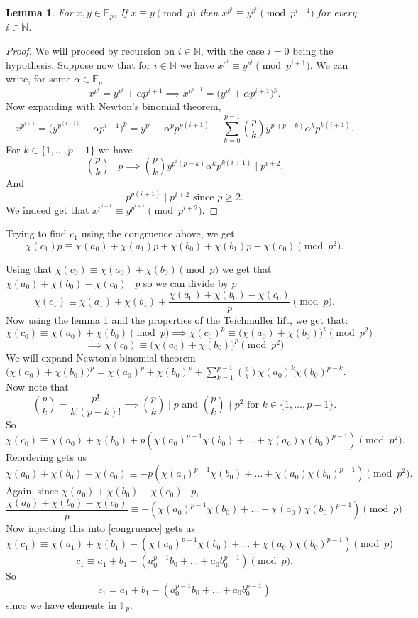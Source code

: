 \documentclass[oneside, a4paper, onecolumn, 11pt]{article}
\newtheorem{lemma}{Lemma}
\theoremstyle{definition}
\begin{document}
\begin{lemma}\label{equiv+i}
For $x,y\in \mathbb{F}_p$, If $x\equiv y \pmod p$ then $x^{p^i}\equiv y^{p^i} \pmod {p^{i+1}}$ for every $i\in\mathbb{N}$.
\end{lemma}
\begin{proof}
  We will proceed by recursion on $i\in\mathbb{N}$, with the case $i=0$ being the hypothesis.
  Suppose now that for $i\in\mathbb{N}$ we have $x^{p^i}\equiv y^{p^i} \pmod {p^{i+1}}$. We can write, for some $\alpha \in\mathbb{F}_p $ \[x^{p^i}=y^{p^i}+\alpha p^{i+1}\implies x^{p^{i+1}}=\bigl(y^{p^i}+\alpha p^{i+1}\bigr)^p.\]
  Now expanding with Newton's binomial theorem, \[x^{p^{i+1}}=\bigl(y^{p^(i+1)}+\alpha p^{i+1}\bigr)^p=y^{p^i}+\alpha^p p^{p(i+1)}+\sum_{k=0}^{p-1}\binom{p}{k}y^{p^{i}(p-k)}\alpha^k p^{k(i+1)}.\]
  For $k\in\{1,\ldots,p-1\}$ we have \[\binom{p}{k}\mid p \implies \binom{p}{k}y^{p^{i}(p-k)}\alpha^k p^{k(i+1)}\mid p^{i+2}.\]
  And \[p^{p(i+1)}\mid p^{i+2} \text{ since }p\geq 2.\]
  We indeed get that $x^{p^{i+1}}\equiv y^{p^{i+1}} \pmod {p^{i+2}}$.
\end{proof}
Trying to find $c_1$ using the congruence above, we get \[\chi(c_1)p \equiv \chi(a_0) + \chi(a_1)p + \chi(b_0) + \chi(b_1)p - \chi(c_0) \pmod{p^2}.\]

Using that $\chi(c_0) \equiv \chi(a_0) + \chi(b_0) \pmod{p}$ we get that $\chi(a_0) + \chi(b_0) - \chi(c_0)  \mid p$ so we can divide by $p$ \begin{equation}\chi(c_1) \equiv  \chi(a_1) +  \chi(b_1) + \frac{\chi(a_0) + \chi(b_0) - \chi(c_0)}{p}\pmod{p}.\end{equation}\label{congruence}
Now using the lemma \ref{equiv+i} and the properties of the Teichmüller lift, we get that: \[\chi(c_0) \equiv \chi(a_0) + \chi(b_0) \pmod{p} \implies \chi(c_0)^p \equiv \bigl(\chi(a_0) + \chi(b_0)\bigr)^p \pmod{p^2}\]\[ \implies \chi(c_0) \equiv \bigl(\chi(a_0) + \chi(b_0)\bigr)^p \pmod{p^2} \]
We will expand Newton's binomial theorem $\bigl(\chi(a_0) + \chi(b_0)\bigr)^p=\chi(a_0)^p+\chi(b_0)^p+\sum_{k=1}^{p-1}\binom{p}{k}\chi(a_0)^k\chi(b_0)^{p-k}$. 
Now note that \[\binom{p}{k}=\frac{p!}{k!(p-k)!}\implies \binom{p}{k}\mid p \text{ and } \binom{p}{k}\nmid p^2 \text{ for } k\in\{1,\ldots,p-1\}.\]
So \[\chi(c_0) \equiv \chi(a_0)+\chi(b_0)+p(\chi(a_0)^{p-1}\chi(b_0)+\ldots+\chi(a_0)\chi(b_0)^{p-1}) \pmod{p^2}.\]
Reordering gets us \[\chi(a_0)+\chi(b_0)-\chi(c_0)\equiv -p(\chi(a_0)^{p-1}\chi(b_0)+\ldots+\chi(a_0)\chi(b_0)^{p-1})\pmod{p^2}.\]
Again, since  $\chi(a_0) + \chi(b_0) - \chi(c_0)  \mid p$, \[\frac{\chi(a_0) + \chi(b_0) - \chi(c_0)}{p}\equiv -(\chi(a_0)^{p-1}\chi(b_0)+\ldots+\chi(a_0)\chi(b_0)^{p-1})\pmod{p}\]
Now injecting this into \ref{congruence} gets us \[\chi(c_1) \equiv  \chi(a_1) +  \chi(b_1) -(\chi(a_0)^{p-1}\chi(b_0)+\ldots+\chi(a_0)\chi(b_0)^{p-1}) \pmod{p}\]
\[c_1 \equiv a_1 + b_1 -(a_0^{p-1}b_0+\ldots+a_0b_0^{p-1}) \pmod{p}.\]
So \[c_1 = a_1 + b_1 -(a_0^{p-1}b_0+\ldots+a_0b_0^{p-1})\] since we have elements in $\mathbb{F}_p$.
\end{document}
